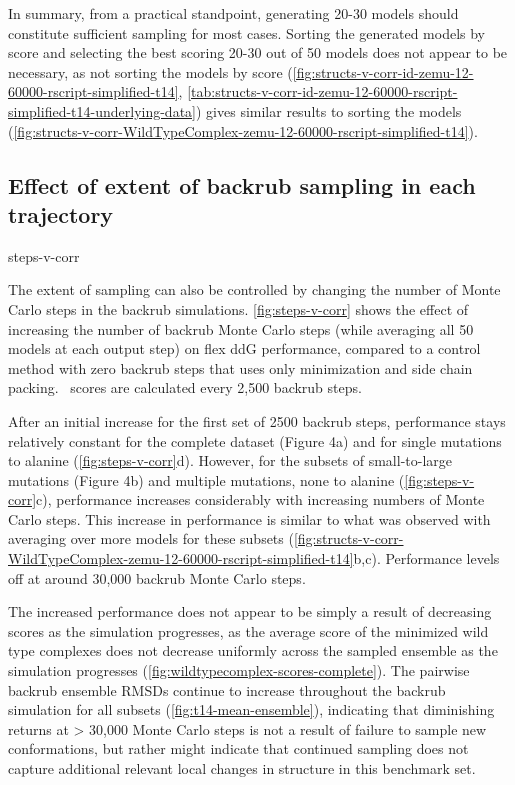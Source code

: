 In summary, from a practical standpoint, generating 20-30 models should constitute sufficient sampling for most cases. Sorting the generated models by score and selecting the best scoring 20-30 out of 50 models does not appear to be necessary, as not sorting the models by score (\cref{fig:structs-v-corr-id-zemu-12-60000-rscript-simplified-t14}, \cref{tab:structs-v-corr-id-zemu-12-60000-rscript-simplified-t14-underlying-data}) gives similar results to sorting the models (\cref{fig:structs-v-corr-WildTypeComplex-zemu-12-60000-rscript-simplified-t14}).

\subsection{Effect of extent of backrub sampling in each trajectory}

{steps-v-corr}

The extent of sampling can also be controlled by changing the number of Monte Carlo steps in the backrub simulations.
\cref{fig:steps-v-corr} shows the effect of increasing the number of backrub Monte Carlo steps (while averaging all 50 models at each output step) on flex ddG performance, compared to a control method with zero backrub steps that uses only minimization and side chain packing.
\ddg\ scores are calculated every 2,500 backrub steps.

After an initial increase for the first set of 2500 backrub steps, performance stays relatively constant for the complete dataset (Figure 4a) and for single mutations to alanine (\cref{fig:steps-v-corr}d). However, for the subsets of small-to-large mutations (Figure 4b) and multiple mutations, none to alanine (\cref{fig:steps-v-corr}c), performance increases considerably with increasing numbers of Monte Carlo steps. This increase in performance is similar to what was observed with averaging over more models for these subsets (\cref{fig:structs-v-corr-WildTypeComplex-zemu-12-60000-rscript-simplified-t14}b,c).
Performance levels off at around 30,000 backrub Monte Carlo steps.

The increased performance does not appear to be simply a result of decreasing scores as the simulation progresses, as the average score of the minimized wild type complexes does not decrease uniformly across the sampled ensemble as the simulation progresses (\cref{fig:wildtypecomplex-scores-complete}).
The pairwise backrub ensemble RMSDs continue to increase throughout the backrub simulation for all subsets (\cref{fig:t14-mean-ensemble}), indicating that diminishing returns at > 30,000 Monte Carlo steps is not a result of failure to sample new conformations, but rather might indicate that continued sampling does not capture additional relevant local changes in structure in this benchmark set.

